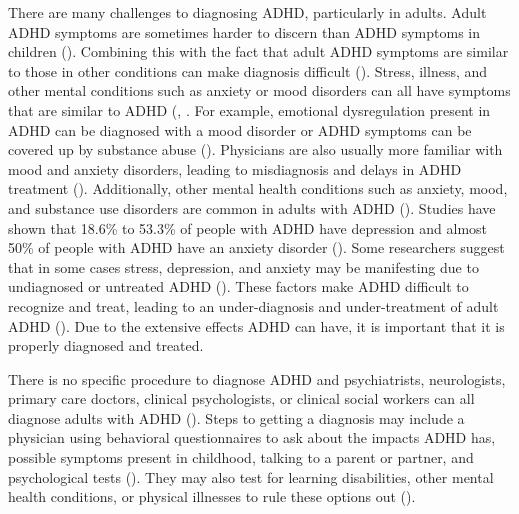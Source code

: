 \documentclass[,article,submit,moreauthors,pdftex]{mdpi}
\begin{document}
There are many challenges to diagnosing ADHD, particularly in adults.
Adult ADHD symptoms are sometimes harder to discern than ADHD symptoms
in children (\citet{noauthor_adult_nodate}). Combining this with the
fact that adult ADHD symptoms are similar to those in other conditions
can make diagnosis difficult (\citet{noauthor_adult_nodate}). Stress,
illness, and other mental conditions such as anxiety or mood disorders
can all have symptoms that are similar to ADHD
(\citet{noauthor_adult_nodate},
\citet{noauthor_attention-deficithyperactivity_nodate2}. For example,
emotional dysregulation present in ADHD can be diagnosed with a mood
disorder or ADHD symptoms can be covered up by substance abuse
(\citet{pmid28830387}). Physicians are also usually more familiar with
mood and anxiety disorders, leading to misdiagnosis and delays in ADHD
treatment (\citet{pmid28830387}). Additionally, other mental health
conditions such as anxiety, mood, and substance use disorders are common
in adults with ADHD
(\citet{noauthor_attention-deficithyperactivity_nodate2}). Studies have
shown that 18.6\% to 53.3\% of people with ADHD have depression and
almost 50\% of people with ADHD have an anxiety disorder
(\citet{pmid28830387}). Some researchers suggest that in some cases
stress, depression, and anxiety may be manifesting due to undiagnosed or
untreated ADHD (\citet{pmid28830387}). These factors make ADHD difficult
to recognize and treat, leading to an under-diagnosis and
under-treatment of adult ADHD (\citet{pmid28830387}). Due to the
extensive effects ADHD can have, it is important that it is properly
diagnosed and treated.

There is no specific procedure to diagnose ADHD and psychiatrists,
neurologists, primary care doctors, clinical psychologists, or clinical
social workers can all diagnose adults with ADHD
(\citet{contributors_diagnosing_nodate}). Steps to getting a diagnosis
may include a physician using behavioral questionnaires to ask about the
impacts ADHD has, possible symptoms present in childhood, talking to a
parent or partner, and psychological tests
(\citet{contributors_diagnosing_nodate}). They may also test for
learning disabilities, other mental health conditions, or physical
illnesses to rule these options out
(\citet{contributors_diagnosing_nodate}).
\end{document}
